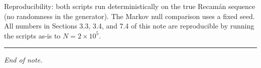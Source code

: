 \documentclass[
  11pt,
]{article}
\begin{document}
Reproducibility: both scripts run deterministically on the true Recamán
sequence (no randomness in the generator). The Markov null comparison
uses a fixed seed. All numbers in Sections 3.3, 3.4, and 7.4 of this
note are reproducible by running the scripts as-is to
\(N = 2 \times 10^5\).

\begin{center}\rule{0.5\linewidth}{0.5pt}\end{center}

\emph{End of note.}
\end{document}
